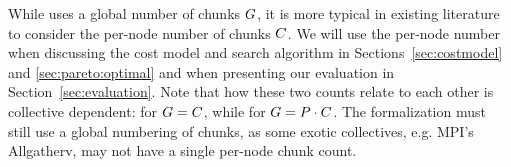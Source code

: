 While \collectiveproblem uses a global number of chunks $G$, it is more
typical in existing literature to consider the per-node number of chunks
$C$. We will use the per-node number when discussing the cost model and
search algorithm in Sections~\ref{sec:costmodel} and \ref{sec:pareto:optimal}
and when presenting our evaluation in Section~\ref{sec:evaluation}. Note that
how these two counts relate to each other is collective dependent: for
\broadcast $G=C$, while for \allgather $G=P\cdot C$.
The formalization must still use a global numbering of chunks, as some exotic
collectives, e.g. MPI's Allgatherv, may not have a single per-node chunk count.

